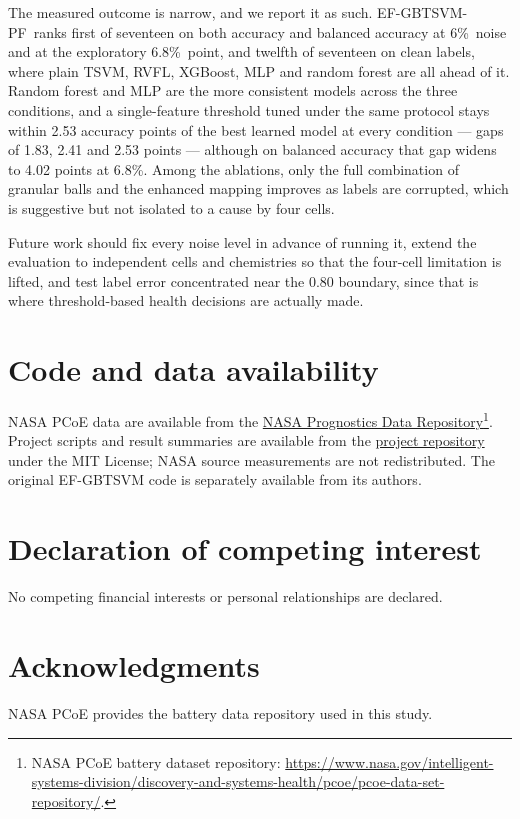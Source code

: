 \documentclass[final,5p,times,twocolumn]{elsarticle}
\newcommand{\proposed}{EF-GBTSVM-PF}
\newcommand{\nz}{\%}
\begin{document}
The measured outcome is narrow, and we report it as such. \proposed\ ranks first of seventeen on both accuracy and balanced accuracy at 6\nz\ noise and at the exploratory 6.8\nz\ point, and twelfth of seventeen on clean labels, where plain TSVM, RVFL, XGBoost, MLP and random forest are all ahead of it. Random forest and MLP are the more consistent models across the three conditions, and a single-feature threshold tuned under the same protocol stays within 2.53 accuracy points of the best learned model at every condition --- gaps of 1.83, 2.41 and 2.53 points --- although on balanced accuracy that gap widens to 4.02 points at 6.8\nz. Among the ablations, only the full combination of granular balls and the enhanced mapping improves as labels are corrupted, which is suggestive but not isolated to a cause by four cells.

Future work should fix every noise level in advance of running it, extend the evaluation to independent cells and chemistries so that the four-cell limitation is lifted, and test label error concentrated near the 0.80 boundary, since that is where threshold-based health decisions are actually made.

\section*{Code and data availability}
NASA PCoE data are available from the \href{https://www.nasa.gov/intelligent-systems-division/discovery-and-systems-health/pcoe/pcoe-data-set-repository/}{NASA Prognostics Data Repository}\footnote{NASA PCoE battery dataset repository: \url{https://www.nasa.gov/intelligent-systems-division/discovery-and-systems-health/pcoe/pcoe-data-set-repository/}.}. Project scripts and result summaries are available from the \href{https://github.com/Vansh-lab/ef-gbtsvm-battery-label-noise}{project repository} under the MIT License; NASA source measurements are not redistributed. The original EF-GBTSVM code is separately available from its authors.
\section*{Declaration of competing interest}
No competing financial interests or personal relationships are declared.
\section*{Acknowledgments}
NASA PCoE provides the battery data repository used in this study.


\end{document}
